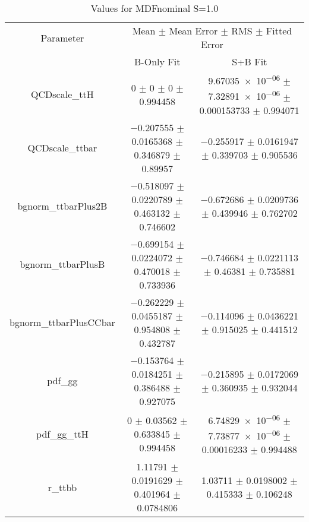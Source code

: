 \begin{table}
\centering
\caption{Values for MDFnominal S=1.0}
\begin{tabular}{ccc}
\toprule
Parameter & \multicolumn{2}{c}{Mean $\pm$ Mean Error $\pm$ RMS $\pm$ Fitted Error}\\
 & B-Only Fit & S+B Fit\\
\midrule
QCDscale\_ttH & \num{0} $\pm$ \num{0} $\pm$ \num{0} $\pm$ \num{0.994458} & \num{9.67035e-06} $\pm$ \num{7.32891e-06} $\pm$ \num{0.000153733} $\pm$ \num{0.994071}\\
QCDscale\_ttbar & \num{-0.207555} $\pm$ \num{0.0165368} $\pm$ \num{0.346879} $\pm$ \num{0.89957} & \num{-0.255917} $\pm$ \num{0.0161947} $\pm$ \num{0.339703} $\pm$ \num{0.905536}\\
bgnorm\_ttbarPlus2B & \num{-0.518097} $\pm$ \num{0.0220789} $\pm$ \num{0.463132} $\pm$ \num{0.746602} & \num{-0.672686} $\pm$ \num{0.0209736} $\pm$ \num{0.439946} $\pm$ \num{0.762702}\\
bgnorm\_ttbarPlusB & \num{-0.699154} $\pm$ \num{0.0224072} $\pm$ \num{0.470018} $\pm$ \num{0.733936} & \num{-0.746684} $\pm$ \num{0.0221113} $\pm$ \num{0.46381} $\pm$ \num{0.735881}\\
bgnorm\_ttbarPlusCCbar & \num{-0.262229} $\pm$ \num{0.0455187} $\pm$ \num{0.954808} $\pm$ \num{0.432787} & \num{-0.114096} $\pm$ \num{0.0436221} $\pm$ \num{0.915025} $\pm$ \num{0.441512}\\
pdf\_gg & \num{-0.153764} $\pm$ \num{0.0184251} $\pm$ \num{0.386488} $\pm$ \num{0.927075} & \num{-0.215895} $\pm$ \num{0.0172069} $\pm$ \num{0.360935} $\pm$ \num{0.932044}\\
pdf\_gg\_ttH & \num{0} $\pm$ \num{0.03562} $\pm$ \num{0.633845} $\pm$ \num{0.994458} & \num{6.74829e-06} $\pm$ \num{7.73877e-06} $\pm$ \num{0.00016233} $\pm$ \num{0.994488}\\
r\_ttbb & \num{1.11791} $\pm$ \num{0.0191629} $\pm$ \num{0.401964} $\pm$ \num{0.0784806} & \num{1.03711} $\pm$ \num{0.0198002} $\pm$ \num{0.415333} $\pm$ \num{0.106248}\\
\bottomrule
\end{tabular}
\end{table}